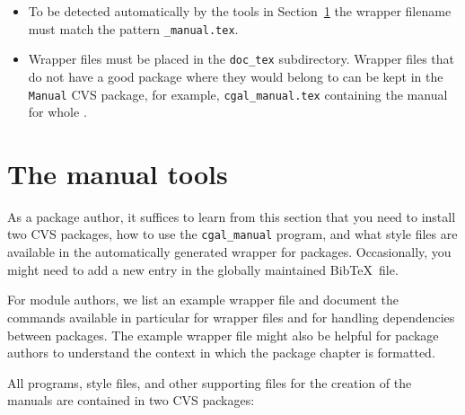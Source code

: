 \begin{itemize}  
   \item To be detected automatically by the tools in
         Section~\ref{sec:manual_tools} the wrapper filename must
         match the pattern {\tt *\_manual.tex}. 
   \item Wrapper files must be placed in the \texttt{doc\_tex}
         subdirectory. Wrapper files that do not have a good package
         where they would belong to can be kept in the \texttt{Manual}
         CVS package, for example, \texttt{cgal\_manual.tex}
         containing the manual for whole \cgal.
\end{itemize}



\section{The manual tools}
\label{sec:manual_tools}
\ccModifierCrossRefOff
{}

As a package author, it suffices to learn from this section that you
need to install two CVS packages, how to use the \texttt{cgal\_manual}
program, and what style files are available in the automatically
generated wrapper for packages. Occasionally, you might need to add a
new entry in the globally maintained Bib\TeX\ file.

For module authors, we list an example wrapper file and document the
commands available in particular for wrapper files and for handling
dependencies between packages. The example wrapper file might also be
helpful for package authors to understand the context in which the
package chapter is formatted.

All programs, style files, and other supporting files for the creation
of the manuals are contained in two CVS packages:

